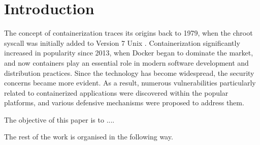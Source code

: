 \section{Introduction}

The concept of containerization traces its origins back to 1979, when the chroot syscall was initially added to Version 7 Unix \cite{1}. Containerization significantly increased in popularity since 2013, when Docker began to dominate the market, and now containers play an essential role in modern software development and distribution practices. Since the technology has become widespread, the security concerns became more evident. As a result, numerous vulnerabilities particularly related to containerized applications were discovered within the popular platforms, and various defensive mechanisms were proposed to address them.

The objective of this paper is to ....

The rest of the work is organised in the following way. 

